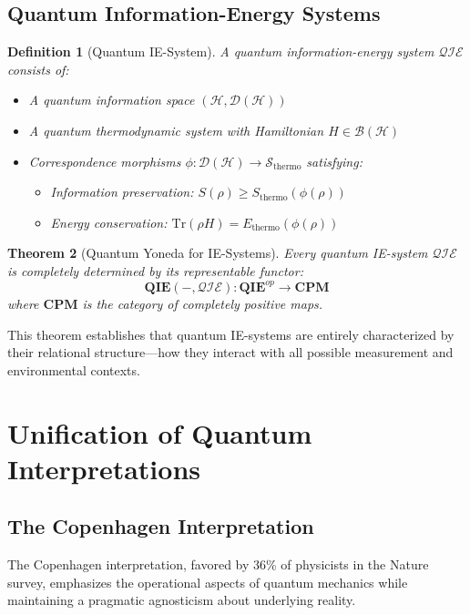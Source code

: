 \documentclass[12pt,a4paper]{article}
\newtheorem{theorem}{Theorem}[section]
\newtheorem{definition}[theorem]{Definition}
\begin{document}
\subsection{Quantum Information-Energy Systems}

\begin{definition}[Quantum IE-System]
A quantum information-energy system $\mathcal{QIE}$ consists of:
\begin{itemize}
\item A quantum information space $(\mathcal{H}, \mathcal{D}(\mathcal{H}))$
\item A quantum thermodynamic system with Hamiltonian $H \in \mathcal{B}(\mathcal{H})$
\item Correspondence morphisms $\phi: \mathcal{D}(\mathcal{H}) \to \mathcal{S}_{\text{thermo}}$ satisfying:
  \begin{itemize}
  \item Information preservation: $S(\rho) \geq S_{\text{thermo}}(\phi(\rho))$
  \item Energy conservation: $\text{Tr}(\rho H) = E_{\text{thermo}}(\phi(\rho))$
  \end{itemize}
\end{itemize}
\end{definition}

\begin{theorem}[Quantum Yoneda for IE-Systems]
Every quantum IE-system $\mathcal{QIE}$ is completely determined by its representable functor:
\[
\mathbf{QIE}(-, \mathcal{QIE}): \mathbf{QIE}^{op} \to \mathbf{CPM}
\]
where $\mathbf{CPM}$ is the category of completely positive maps.
\end{theorem}

This theorem establishes that quantum IE-systems are entirely characterized by their relational structure—how they interact with all possible measurement and environmental contexts.

\section{Unification of Quantum Interpretations}

\subsection{The Copenhagen Interpretation}

The Copenhagen interpretation, favored by 36\% of physicists in the Nature survey, emphasizes the operational aspects of quantum mechanics while maintaining a pragmatic agnosticism about underlying reality.
\end{document}
